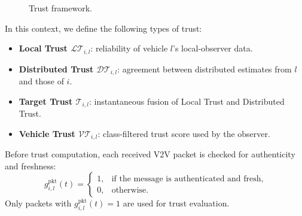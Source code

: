 \documentclass[letterpaper,journal]{IEEEtran}
\def\LT{\mathcal{LT}} %
\def\DT{\mathcal{DT}} %
\def\VT{\mathcal{VT}} %
\def\T{\mathcal{T}} %
\begin{document}
\begin{figure}[!ht]
    \caption{Trust framework.}
    \label{fig_trust_framework}
\end{figure}

In this context, we define the following types of trust:
\begin{itemize}
    \item \textbf{Local Trust $\LT_{i,l}$}: reliability of vehicle $l$'s local-observer data.
    \item \textbf{Distributed Trust $\DT_{i,l}$}: agreement between distributed estimates from $l$ and those of $i$.
    \item \textbf{Target Trust $\T_{i,l}$}: instantaneous fusion of Local Trust and Distributed Trust.
    \item \textbf{Vehicle Trust $\VT_{i,l}$}: class-filtered trust score used by the observer.
\end{itemize}

Before trust computation, each received V2V packet is checked for authenticity and freshness:
{\small
\begin{equation}
    g_{i,l}^{\mathrm{pkt}}(t)=
    \begin{cases}
        1, & \text{if the message is authenticated and fresh}, \\
        0, & \text{otherwise.}
    \end{cases}
\end{equation}
}
Only packets with $g_{i,l}^{\mathrm{pkt}}(t)=1$ are used for trust evaluation.
\end{document}
